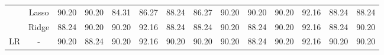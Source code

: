 \begin{landscape}
\begin{table}[]
{\begin{tabular}{cc|clllllclllll}
				& Lasso                                 & 90.20                                                             & 90.20                                                                & 84.31                                                                & 86.27                                                               & 88.24                                                            & \multicolumn{1}{c|}{86.27}                                                                   & 90.20                                                             & 90.20                                                                & 90.20                                                                & 92.16                                                               & 88.24                                                            & 88.24                                                                   \\ 
				& Ridge                                 & 88.24                                                             & 90.20                                                                & 90.20                                                                & 92.16                                                               & 88.24                                                            & \multicolumn{1}{c|}{88.24}                                                                   & 90.20                                                             & 88.24                                                                & 90.20                                                                & 92.16                                                               & 88.24                                                            & 90.20                                                                   \\ \hline
				\multirow{3}{*}{LR}             & -                                     & 90.20                                                             & 88.24                                                                & 90.20                                                                & 92.16                                                               & 90.20                                                            & \multicolumn{1}{c|}{90.20}                                                                   & 90.20                                                             & 88.24                                                                & 90.20                                                                & 92.16                                                               & 90.20                                                            & 90.20                                                                   \\
				

\end{tabular}}
\end{table}
\end{landscape}
